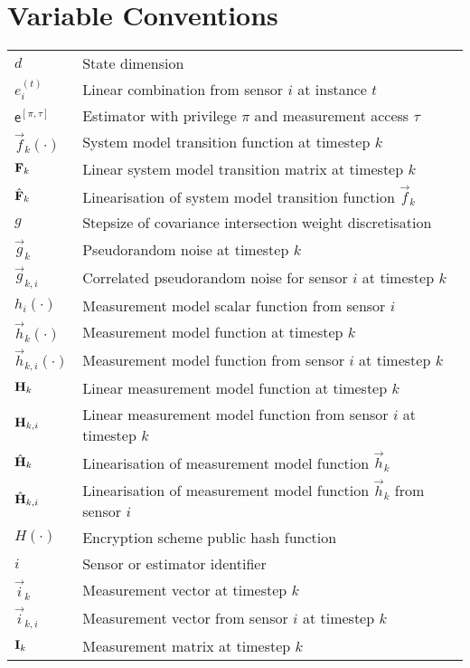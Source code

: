 \documentclass[oneside]{scrbook}
\theoremstyle{definition}
\theoremstyle{definition}
\theoremstyle{remark}
\begin{document}
\section*{Variable Conventions}
\begin{longtable}{p{}p{}}
    $d$ & State dimension\\
    $e^{(t)}_i$ & Linear combination from sensor $i$ at instance $t$\\
    $\mathsf{e}^{[\pi,\tau]}$ & Estimator with privilege $\pi$ and measurement access $\tau$\\
    $\vec{f}_k(\cdot)$ & System model transition function at timestep $k$\\
    ${{\mathbf{F}}}_k$ & Linear system model transition matrix at timestep $k$\\
    $\hat{{{\mathbf{F}}}}_k$ & Linearisation of system model transition function $\vec{f}_k$\\
    $g$ & Stepsize of covariance intersection weight discretisation\\
    $\vec{g}_k$ & Pseudorandom noise at timestep $k$\\
    $\vec{g}_{k,i}$ & Correlated pseudorandom noise for sensor $i$ at timestep $k$\\
    $h_i(\cdot)$ & Measurement model scalar function from sensor $i$\\
    $\vec{h}_k(\cdot)$ & Measurement model function at timestep $k$\\
    $\vec{h}_{k,i}(\cdot)$ & Measurement model function from sensor $i$ at timestep $k$\\
    ${{\mathbf{H}}}_k$ & Linear measurement model function at timestep $k$\\
    ${{\mathbf{H}}}_{k,i}$ & Linear measurement model function from sensor $i$ at timestep $k$\\
    $\hat{{{\mathbf{H}}}}_k$ & Linearisation of measurement model function $\vec{h}_k$\\
    $\hat{{{\mathbf{H}}}}_{k,i}$ & Linearisation of measurement model function $\vec{h}_k$ from sensor $i$\\
    $H(\cdot)$ & Encryption scheme public hash function\\
    $i$ & Sensor or estimator identifier\\
    $\vec{i}_k$ & Measurement vector at timestep $k$\\
    $\vec{i}_{k,i}$ & Measurement vector from sensor $i$ at timestep $k$\\
    ${{\mathbf{I}}}_k$ & Measurement matrix at timestep $k$\\

\end{longtable}
\end{document}
